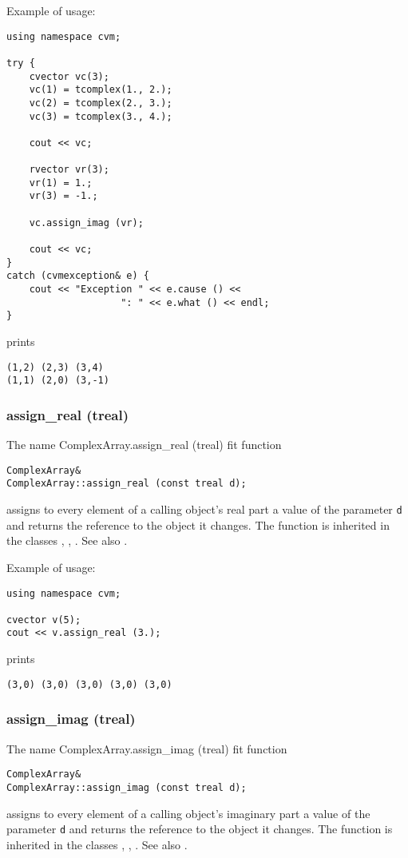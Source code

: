 Example of usage:
\begin{verbatim}
using namespace cvm;

try {
    cvector vc(3);
    vc(1) = tcomplex(1., 2.);
    vc(2) = tcomplex(2., 3.);
    vc(3) = tcomplex(3., 4.);

    cout << vc;

    rvector vr(3);
    vr(1) = 1.;
    vr(3) = -1.;

    vc.assign_imag (vr);

    cout << vc;
}
catch (cvmexception& e) {
    cout << "Exception " << e.cause () <<
                    ": " << e.what () << endl;
}
\end{verbatim}
prints
\begin{verbatim}
(1,2) (2,3) (3,4)
(1,1) (2,0) (3,-1)
\end{verbatim}
\newpage




\subsubsection{assign\_real (treal)}
The%
\pdfdest name {ComplexArray.assign_real (treal)} fit{ }
function
\begin{verbatim}
ComplexArray&
ComplexArray::assign_real (const treal d);
\end{verbatim}
assigns to every element of a calling object's real part
a value of the parameter
\verb"d" and returns the reference to
the object it changes.
The function is inherited in the classes
,
,
.
See also .

Example of usage:
\begin{verbatim}
using namespace cvm;

cvector v(5);
cout << v.assign_real (3.);
\end{verbatim}
prints
\begin{verbatim}
(3,0) (3,0) (3,0) (3,0) (3,0)
\end{verbatim}
\newpage


\subsubsection{assign\_imag (treal)}
The%
\pdfdest name {ComplexArray.assign_imag (treal)} fit{ }
function
\begin{verbatim}
ComplexArray&
ComplexArray::assign_imag (const treal d);
\end{verbatim}
assigns to every element of a calling object's imaginary part
a value of the parameter
\verb"d" and returns the reference to
the object it changes.
The function is inherited in the classes
,
,
.
See also .

